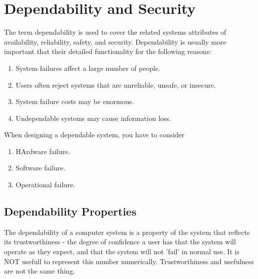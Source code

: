 \documentclass{article}
\begin{document}
 
\setcounter{section}{10}
\section{Dependability and Security}
The term dependability is used to cover the related systems attributes of availability, reliability, safety, and security.  Dependability is usually more important that their detailed functionality for the following reasons:
\begin{enumerate}
    \item System failures affect a large number of people.
    \item Users often reject systems that are unreliable, unsafe, or insecure.
    \item System failure costs may be enormous.
    \item Undependable systems may cause information loss.
\end{enumerate}
When designing a dependable system, you have to consider
\begin{enumerate}
    \item HArdware failure.
    \item Software failure.
    \item Operational failure.
\end{enumerate}
\subsection{Dependability Properties}
The dependability of a computer system is a property of the system that reflects its trustworthiness - the degree of confidence a user has that the system will operate as they expect, and that the system will not 'fail' in normal use.  It is NOT usefull to represent this number numerically.  Trustworthiness and usefulness are not the same thing.
\end{document}
